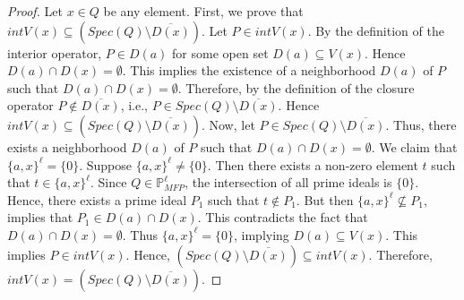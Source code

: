 \documentclass[10pt,a4paper]{amsart}
\begin{document}
\begin{proof} 
	Let $x\in Q$ be any element. First, we prove that $int V(x)\subseteq (Spec(Q)\setminus \overline{D(x)})$. Let $P\in int V(x)$. By the definition of the interior operator, $P\in D(a)$ for some open set $D(a)\subseteq V(x)$. Hence $D(a)\cap D(x) = \emptyset$. This implies the existence of a neighborhood $D(a)$ of $P$ such that $D(a)\cap D(x)=\emptyset $. Therefore, by the definition of the closure operator $P\notin \overline{D(x)}$, i.e., $P\in Spec(Q)\setminus \overline{D(x)}$. Hence $int V(x) \subseteq (Spec(Q)\setminus \overline{D(x)})$. Now, let $P\in Spec(Q)\setminus \overline{D(x)}$. Thus, there exists a neighborhood $D(a)$ of $P$ such that $D(a)\cap D(x) = \emptyset $. We claim that $\{a,x\}^{\ell}=\{0\}$. Suppose $\{a,x\}^{\ell}\neq \{0\}$. Then there exists a non-zero element $t$ such that $t\in \{a, x\}^{\ell}$. Since $Q\in \mathbb{P}^{\ell}_{MFP}$, the intersection of all prime ideals is $\{0\}$. Hence, there exists a prime ideal $P_1$ such that $t\not \in P_1$. But then $\{a, x\}^{\ell}\not \subseteq P_1$, implies that $P_1\in D(a)\cap D(x)$.  This contradicts the fact that $D(a)\cap D(x)=\emptyset $. Thus $\{a, x\}^{\ell}=\{0\}$, implying $D(a)\subseteq V(x)$. This implies $P\in int V(x)$. Hence, $(Spec(Q)\setminus \overline{D(x)})\subseteq int V(x)$. Therefore, $int V(x)=(Spec(Q)\setminus \overline{D(x)}).$ 
\end{proof}
\end{document}
